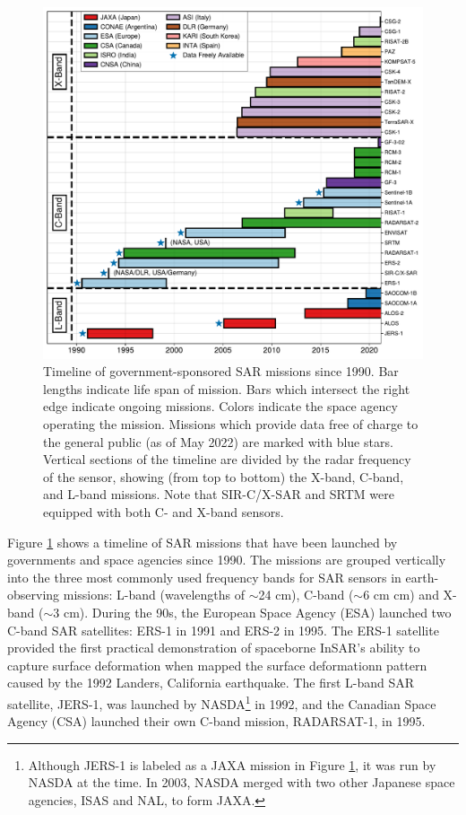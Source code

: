 \begin{figure}
	\centering
	\includegraphics[width=1.1\textwidth]{figures/chapter3-sar/sar-missions.pdf}
	\caption[Timeline of government SAR missions]{Timeline of government-sponsored SAR missions since 1990. Bar lengths indicate life span of mission. Bars which intersect the right edge indicate ongoing missions.
		Colors indicate the space agency operating the mission.
		Missions which provide data free of charge to the general public (as of May 2022) are marked with blue stars.
		Vertical sections of the timeline are divided by the radar frequency of the sensor, showing (from top to bottom) the X-band, C-band, and L-band missions.
		Note that SIR-C/X-SAR and SRTM were equipped with both C- and X-band sensors.}
	\label{fig:ch3-sar-missions}
\end{figure}


Figure \ref{fig:ch3-sar-missions} shows a timeline of SAR missions that have been launched by governments and space agencies since 1990. The missions are grouped vertically into the three most commonly used frequency bands for SAR sensors in earth-observing missions: L-band (wavelengths of $\sim$24 cm), C-band ($\sim$6 cm cm) and X-band ($\sim$3 cm).
During the 90s, the European Space Agency (ESA) launched two C-band SAR satellites: ERS-1 in 1991 and ERS-2 in 1995. The ERS-1 satellite provided the first practical demonstration of spaceborne InSAR's ability to capture surface deformation
when \cite{Massonnet1993DisplacementFieldLanders} mapped the  surface deformationn pattern caused by the 1992 Landers, California earthquake. The first L-band SAR satellite, JERS-1, was launched by NASDA\footnote{Although JERS-1 is labeled as a JAXA mission in Figure \ref{fig:ch3-sar-missions}, it was run by NASDA at the time. In 2003, NASDA merged with two other Japanese space agencies, ISAS and NAL, to form JAXA.} in 1992, and the Canadian Space Agency (CSA) launched their own C-band mission, RADARSAT-1, in 1995.


